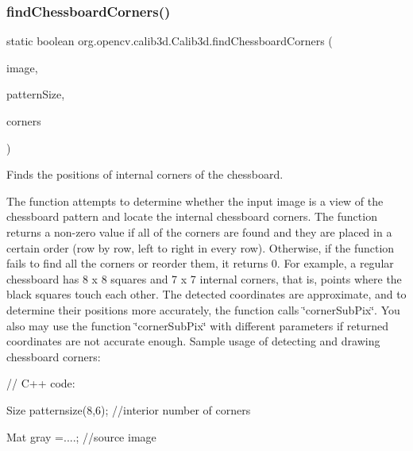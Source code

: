 \subsubsection{\texorpdfstring{find\+Chessboard\+Corners()}{findChessboardCorners()}\hspace{0.1cm}{\footnotesize\ttfamily [2/2]}}
{\footnotesize\ttfamily static boolean org.\+opencv.\+calib3d.\+Calib3d.\+find\+Chessboard\+Corners (\begin{DoxyParamCaption}\item[{\mbox{\hyperlink{classorg_1_1opencv_1_1core_1_1_mat}{Mat}}}]{image,  }\item[{\mbox{\hyperlink{classorg_1_1opencv_1_1core_1_1_size}{Size}}}]{pattern\+Size,  }\item[{\mbox{\hyperlink{classorg_1_1opencv_1_1core_1_1_mat_of_point2f}{Mat\+Of\+Point2f}}}]{corners }\end{DoxyParamCaption})\hspace{0.3cm}{\ttfamily [static]}}

Finds the positions of internal corners of the chessboard.

The function attempts to determine whether the input image is a view of the chessboard pattern and locate the internal chessboard corners. The function returns a non-\/zero value if all of the corners are found and they are placed in a certain order (row by row, left to right in every row). Otherwise, if the function fails to find all the corners or reorder them, it returns 0. For example, a regular chessboard has 8 x 8 squares and 7 x 7 internal corners, that is, points where the black squares touch each other. The detected coordinates are approximate, and to determine their positions more accurately, the function calls \char`\"{}corner\+Sub\+Pix\char`\"{}. You also may use the function \char`\"{}corner\+Sub\+Pix\char`\"{} with different parameters if returned coordinates are not accurate enough. Sample usage of detecting and drawing chessboard corners\+: {\ttfamily }

{\ttfamily }

{\ttfamily }

{\ttfamily // C++ code\+:}

{\ttfamily }

{\ttfamily }

{\ttfamily Size patternsize(8,6); //interior number of corners}

{\ttfamily }

{\ttfamily }

{\ttfamily Mat gray =....; //source image}

